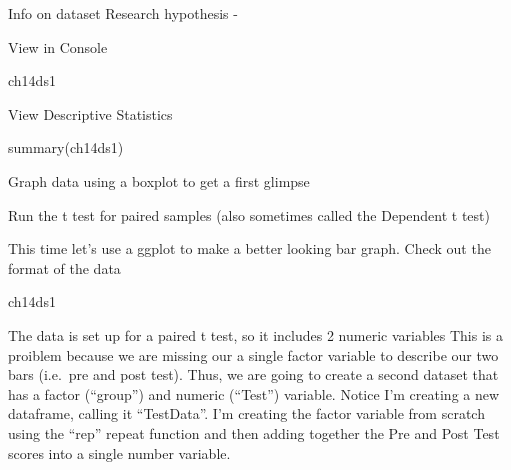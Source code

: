 \documentclass[
]{book}
\newenvironment{Shaded}{\begin{snugshade}}{\end{snugshade}}
\newcommand{\AttributeTok}[1]{\textcolor[rgb]{0.77,0.63,0.00}{#1}}
\newcommand{\ConstantTok}[1]{\textcolor[rgb]{0.00,0.00,0.00}{#1}}
\newcommand{\FunctionTok}[1]{\textcolor[rgb]{0.00,0.00,0.00}{#1}}
\newcommand{\NormalTok}[1]{#1}
\newcommand{\SpecialCharTok}[1]{\textcolor[rgb]{0.00,0.00,0.00}{#1}}
\begin{document}
Info on dataset
Research hypothesis -

View in Console

\begin{Shaded}
\begin{Highlighting}[]
\NormalTok{ch14ds1}
\end{Highlighting}
\end{Shaded}

View Descriptive Statistics

\begin{Shaded}
\begin{Highlighting}[]
\FunctionTok{summary}\NormalTok{(ch14ds1)}
\end{Highlighting}
\end{Shaded}

Graph data using a boxplot to get a first glimpse

\begin{Shaded}
\end{Shaded}

Run the t test for paired samples (also sometimes called the Dependent t test)

\begin{Shaded}
\end{Shaded}

This time let's use a ggplot to make a better looking bar graph. Check out the format of the data

\begin{Shaded}
\begin{Highlighting}[]
\NormalTok{ch14ds1}
\end{Highlighting}
\end{Shaded}

The data is set up for a paired t test, so it includes 2 numeric variables This is a proiblem because we are missing our a single factor variable to describe our two bars (i.e.~pre and post test).
Thus, we are going to create a second dataset that has a factor (``group'') and numeric (``Test'') variable. Notice I'm creating a new dataframe, calling it ``TestData''. I'm creating the factor variable from scratch using the ``rep'' repeat function and then adding together the Pre and Post Test scores into a single number variable.
\end{document}
